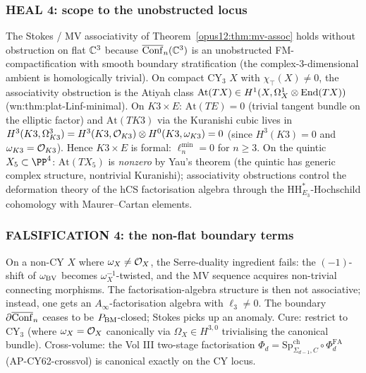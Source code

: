 \subsubsection{HEAL 4: scope to the unobstructed locus}

\begin{proposition}\ClaimStatusProposition
\label{opus12:prop:assoc-scope}
The Stokes / MV associativity of Theorem~\ref{opus12:thm:mv-assoc}
holds without obstruction on flat $\mathbb{C}^3$ because
$\overline{\mathrm{Conf}}_n(\mathbb{C}^3)$ is an unobstructed FM-compactification
with smooth boundary stratification (the complex-3-dimensional
ambient is homologically trivial). On compact CY$_3$ $X$ with
$\chi_\top(X) \ne 0$, the associativity obstruction is the Atiyah
class $\mathrm{At}(TX) \in H^1(X, \Omega^1_X \otimes \mathrm{End}(TX))$
(wn:thm:plat-Linf-minimal). On $K3 \times E$: $\mathrm{At}(TE) = 0$
(trivial tangent bundle on the elliptic factor) and
$\mathrm{At}(TK3)$ via the Kuranishi cubic lives in
$H^3(K3, \Omega^3_{K3}) = H^3(K3, \mathcal{O}_{K3}) \otimes H^0(K3, \omega_{K3})
= 0$ (since $H^3(K3) = 0$ and $\omega_{K3} = \mathcal{O}_{K3}$). Hence
$K3 \times E$ is formal: $\ell_n^{\min} = 0$ for $n \ge 3$.
On the quintic $X_5 \subset \PP^4$: $\mathrm{At}(TX_5)$ is \emph{nonzero}
by Yau's theorem (the quintic has generic complex structure,
nontrivial Kuranishi); associativity obstructions control the
deformation theory of the hCS factorisation algebra through the
$\mathrm{HH}^*_{E_3}$-Hochschild cohomology with Maurer--Cartan
elements.
\end{proposition}

\subsubsection{FALSIFICATION 4: the non-flat boundary terms}

\begin{proposition}\ClaimStatusProposition
\label{opus12:prop:falsify-boundary}
On a non-CY $X$ where $\omega_X \ne \mathcal{O}_X$, the Serre-duality
ingredient fails: the $(-1)$-shift of $\omega_{\mathrm{BV}}$ becomes
$\omega_X^{-1}$-twisted, and the MV sequence acquires non-trivial
connecting morphisms. The factorisation-algebra structure is then
not associative; instead, one gets an $A_\infty$-factorisation
algebra with $\ell_3 \ne 0$. The boundary $\partial \overline{\mathrm{Conf}}_n$
ceases to be $P_{\mathrm{BM}}$-closed; Stokes picks up an anomaly. Cure:
restrict to CY$_3$ (where $\omega_X = \mathcal{O}_X$ canonically via
$\Omega_X \in H^{3,0}$ trivialising the canonical bundle).
Cross-volume: the Vol III two-stage factorisation
$\Phi_d = \mathrm{Sp}^{\mathrm{ch}}_{\Sigma_{d-1}, C} \circ
\Phi^{\mathrm{FA}}_d$ (AP-CY62-crossvol) is canonical exactly on the
CY locus.
\end{proposition}

